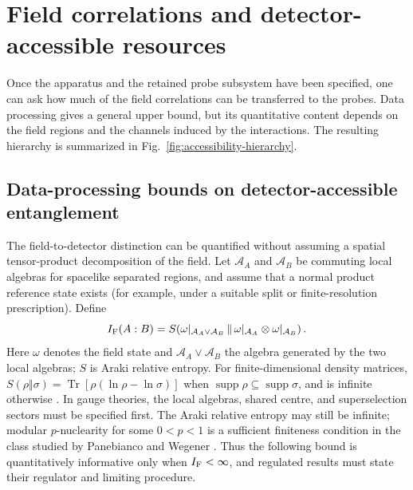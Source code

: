 \documentclass[pdflatex,sn-mathphys-num]{sn-jnl}
\newcommand{\Tr}{\operatorname{Tr}}
\begin{document}
\section{Field correlations and detector-accessible resources}
\label{sec:accessibility}
Once the apparatus and the retained probe subsystem have been specified, one can ask how much of the field correlations can be transferred to the probes. Data processing gives a general upper bound, but its quantitative content depends on the field regions and the channels induced by the interactions. The resulting hierarchy is summarized in Fig.~\ref{fig:accessibility-hierarchy}.

\subsection{Data-processing bounds on detector-accessible entanglement}
\label{subsec:field-to-detector-bound}

The field-to-detector distinction can be quantified without assuming a spatial tensor-product decomposition of the field. Let $\mathcal A_A$ and $\mathcal A_B$ be commuting local algebras for spacelike separated regions, and assume that a normal product reference state exists (for example, under a suitable split or finite-resolution prescription). Define
\begin{equation}
I_{\rm F}(A:B)=
S\!\left(\omega|_{\mathcal A_A\vee\mathcal A_B}
\,\middle\|\,
\omega|_{\mathcal A_A}\otimes\omega|_{\mathcal A_B}\right).
\label{eq:field-algebra-mutual-info}
\end{equation}
Here $\omega$ denotes the field state and $\mathcal A_A\vee\mathcal A_B$ the algebra generated by the two local algebras; $S$ is Araki relative entropy. For finite-dimensional density matrices, $S(\rho\Vert\sigma)=\Tr[\rho(\ln\rho-\ln\sigma)]$ when $\operatorname{supp}\rho\subseteq\operatorname{supp}\sigma$, and is infinite otherwise \cite{Watrous2018}. In gauge theories, the local algebras, shared centre, and superselection sectors must be specified first. The Araki relative entropy may still be infinite; modular $p$-nuclearity for some $0<p<1$ is a sufficient finiteness condition in the class studied by Panebianco and Wegener \cite{PanebiancoWegener2021}. Thus the following bound is quantitatively informative only when $I_{\rm F}<\infty$, and regulated results must state their regulator and limiting procedure.
\end{document}
